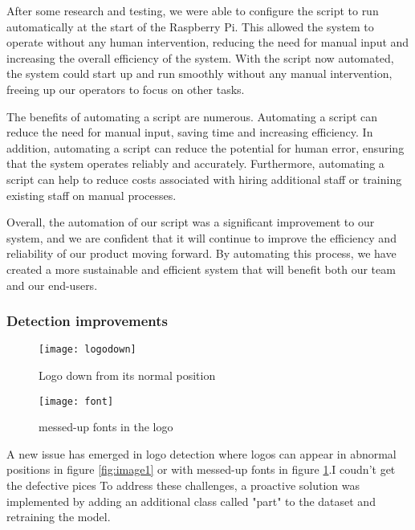 After some research and testing, we were able to configure the script to run automatically at the start of the Raspberry Pi. This allowed the system to operate without any human intervention, reducing the need for manual input and increasing the overall efficiency of the system. With the script now automated, the system could start up and run smoothly without any manual intervention, freeing up our operators to focus on other tasks.

The benefits of automating a script are numerous. Automating a script can reduce the need for manual input, saving time and increasing efficiency. In addition, automating a script can reduce the potential for human error, ensuring that the system operates reliably and accurately. Furthermore, automating a script can help to reduce costs associated with hiring additional staff or training existing staff on manual processes.

Overall, the automation of our script was a significant improvement to our system, and we are confident that it will continue to improve the efficiency and reliability of our product moving forward. By automating this process, we have created a more sustainable and efficient system that will benefit both our team and our end-users.
\subsubsection{Detection improvements}

\FloatBarrier

\begin{figure}[htbp]
    \centering
    
    \begin{minipage}{0.4\textwidth}
        \centering
        \texttt{[image: logodown]}
        \caption{Logo down from its normal position}
        \label{fig:image1}
    \end{minipage}
    \hfill
    \begin{minipage}{0.4\textwidth}
        \centering
        \texttt{[image: font]}
        \caption{messed-up fonts in the logo}
        \label{fig:image2}
    \end{minipage}
        
\end{figure}
\FloatBarrier
A new issue has emerged in logo detection where logos can appear in abnormal positions in figure \ref{fig:image1} or with messed-up fonts  in figure \ref{fig:image2}.I coudn't get the defective pices To address these challenges, a proactive solution was implemented by adding an additional class called "part" to the dataset and retraining the model.
\FloatBarrier

